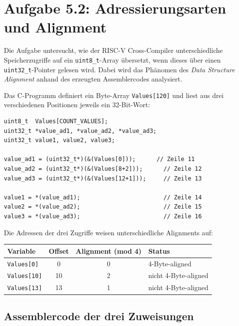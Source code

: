 \section{Aufgabe 5.2: Adressierungsarten und Alignment}

Die Aufgabe untersucht, wie der RISC-V Cross-Compiler unterschiedliche Speicherzugriffe auf ein \texttt{uint8\_t}-Array übersetzt, wenn dieses über einen \texttt{uint32\_t}-Pointer gelesen wird. Dabei wird das Phänomen des \emph{Data Structure Alignment} anhand des erzeugten Assemblercodes analysiert.

Das C-Programm definiert ein Byte-Array \texttt{Values[120]} und liest aus drei verschiedenen Positionen jeweils ein 32-Bit-Wort:

\begin{verbatim}
uint8_t  Values[COUNT_VALUES];
uint32_t *value_ad1, *value_ad2, *value_ad3;
uint32_t value1, value2, value3;

value_ad1 = (uint32_t*)(&(Values[0]));      // Zeile 11
value_ad2 = (uint32_t*)(&(Values[8+2]));      // Zeile 12
value_ad3 = (uint32_t*)(&(Values[12+1]));     // Zeile 13

value1 = *(value_ad1);                        // Zeile 14
value2 = *(value_ad2);                        // Zeile 15
value3 = *(value_ad3);                        // Zeile 16
\end{verbatim}

Die Adressen der drei Zugriffe weisen unterschiedliche Alignments auf:

\begin{center}
\begin{tabular}{|l|c|c|l|}
\hline
\textbf{Variable} & \textbf{Offset} & \textbf{Alignment (mod 4)} & \textbf{Status} \\
\hline
\texttt{Values[0]}  & 0  & 0 & 4-Byte-aligned \\
\texttt{Values[10]} & 10 & 2 & nicht 4-Byte-aligned \\
\texttt{Values[13]} & 13 & 1 & nicht 4-Byte-aligned \\
\hline
\end{tabular}
\end{center}

\newpage

\subsection{Assemblercode der drei Zuweisungen}

